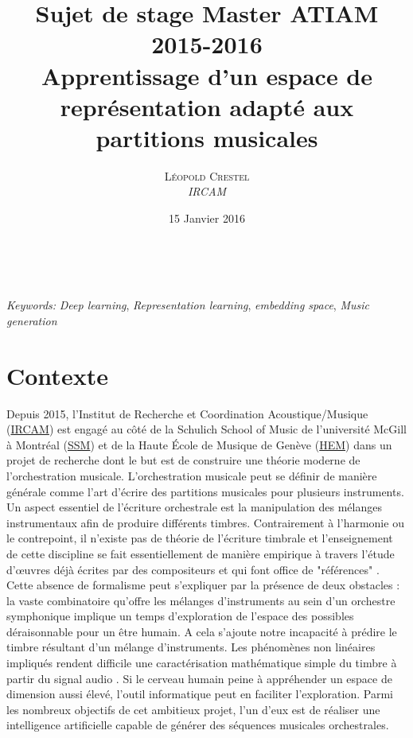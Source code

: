 \documentclass[a4paper, 10pt]{article} %
\title{Sujet de stage Master ATIAM 2015-2016\\ %
\textbf{Apprentissage d'un espace de représentation adapté aux partitions musicales}} %
\author{\textsc{Léopold Crestel} %
\\{\textit{IRCAM}}} %
\date{15 Janvier 2016} %
\makeatletter
\renewcommand{\maketitle}{ %
\begin{flushright} %
{\LARGE\@title} %

\vspace{50pt} %

{\large\@author} %
\\\@date %

\vspace{40pt} %
\end{flushright}
}
\makeatother
\begin{document}
\maketitle %


\hspace*{3,6mm}\textit{Keywords:} \textit{Deep learning}, \textit{Representation learning}, \textit{embedding space}, \textit{Music generation}

\vspace{30pt} %


\section*{Contexte}

Depuis 2015, l'Institut de Recherche et Coordination Acoustique/Musique (\href{http://www.ircam.fr/}{IRCAM}) est engagé au côté de la Schulich School of Music de l'université McGill à Montréal (\href{http://www.mcgill.ca/music/}{SSM}) et de la Haute École de Musique de Genève	(\href{http://www.hesge.ch/hem/}{HEM}) dans un projet de recherche dont le but est de construire une théorie moderne de l'orchestration musicale. L'orchestration musicale peut se définir de manière générale comme l'art d'écrire des partitions musicales pour plusieurs instruments. Un aspect essentiel de l'écriture orchestrale est la manipulation des mélanges instrumentaux afin de produire différents timbres. Contrairement à l'harmonie ou  le contrepoint, il n'existe pas de théorie de l'écriture timbrale et l'enseignement de cette discipline se fait essentiellement de manière empirique à travers l'étude d'œuvres déjà écrites par des compositeurs et qui font office de "références" \cite{koechli_orch}. Cette absence de formalisme peut s'expliquer par la présence de deux obstacles : la vaste combinatoire qu'offre les mélanges d'instruments au sein d'un orchestre symphonique implique un temps d'exploration de l'espace des possibles déraisonnable pour un être humain. A cela s'ajoute notre incapacité à prédire le timbre résultant d'un mélange d'instruments. Les phénomènes non linéaires impliqués rendent difficile une caractérisation mathématique simple du timbre à partir du signal audio \cite{peeters2011timbre}. Si le cerveau humain peine à appréhender un espace de dimension aussi élevé, l'outil informatique peut en faciliter l'exploration. Parmi les nombreux objectifs de cet ambitieux projet, l'un d'eux est de réaliser une intelligence artificielle capable de générer des séquences musicales orchestrales. 
\end{document}
